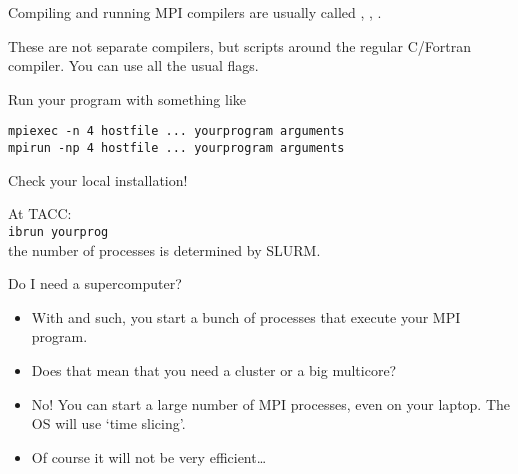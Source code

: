 

\begin{frame}[containsverbatim]{Compiling and running}
  MPI compilers are usually called ,
  , .

  These are not separate compilers,
  but scripts around the regular C/Fortran compiler. You can use all
  the usual flags.

  Run your program with something like
\begin{verbatim}
mpiexec -n 4 hostfile ... yourprogram arguments
mpirun -np 4 hostfile ... yourprogram arguments
\end{verbatim}
\begin{online}
  Check your local installation!
\end{online}
\begin{tacc}
  At TACC:\\
  \verb+ibrun yourprog+\\
  the number of processes is determined by SLURM.
\end{tacc}
\end{frame}

\begin{frame}[containsverbatim]{Do I need a supercomputer?}
  \begin{itemize}
  \item With  and such, you start a bunch of processes that
    execute your MPI program.
  \item Does that mean that you need a cluster or a big multicore?
  \item No! You can start a large number of MPI processes, even on
    your laptop. The OS will use `time slicing'.
  \item Of course it will not be very efficient\ldots
  \end{itemize}
\end{frame}

